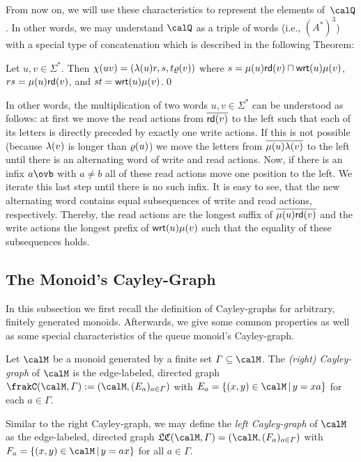 From now on, we will use these characteristics to represent the elements of~$\Qx$. In other words, we may understand $\Qx$ as a triple of words (i.e., $(A^*)^3$) with a special type of concatenation which is described in the following Theorem:

\begin{theorem}\label{thm:concat}
	Let $u,v\in\varSigma^*$. Then
	$\chi(uv)=(\lambda(u)r,s,t\varrho(v))$
	where $s=\mu(u)\mathsf{rd}(v)\sqcap\mathsf{wrt}(u)\mu(v)$, $rs=\mu(u)\mathsf{rd}(v)$, and $st=\mathsf{wrt}(u)\mu(v)$.\qed
\end{theorem}

In other words, the multiplication of two words $u,v\in\varSigma^*$ can be understood as follows: at first we move the read actions from $\overline{\mathsf{rd}(v)}$ to the left such that each of its letters is directly preceded by exactly one write actions. If this is not possible (because $\lambda(v)$ is longer than $\varrho(u)$) we move the letters from $\overline{\mu(u)\lambda(v)}$ to the left until there is an alternating word of write and read actions. Now, if there is an infix $a\ovb$ with $a\neq b$ all of these read actions move one position to the left. We iterate this last step until there is no such infix. It is easy to see, that the new alternating word contains equal subsequences of write and read actions, respectively. Thereby, the read actions are the longest suffix of $\overline{\mu(u)\mathsf{rd}(v)}$ and the write actions the longest prefix of $\mathsf{wrt}(u)\mu(v)$ such that the equality of these subsequences holds.

\subsection{The Monoid's Cayley-Graph}
In this subsection we first recall the definition of Cayley-graphs for arbitrary, finitely generated monoids. Afterwards, we give some common properties as well as some special characteristics of the queue monoid's Cayley-graph.

\begin{definition}
	Let $\calM$ be a monoid generated by a finite set $\varGamma\subseteq\calM$. The \emph{(right) Cayley-graph} of $\calM$ is the edge-labeled, directed graph $\cayley{\calM}{\varGamma}:=(\calM,(E_a)_{a\in\varGamma})$ with
	$E_a=\{(x,y)\in\calM\,|\,y=xa\}$
	for each $a\in\varGamma$.
\end{definition}

Similar to the right Cayley-graph, we may define the \emph{left Cayley-graph} of $\calM$ as the edge-labeled, directed graph $\lcayley{\calM}{\varGamma}=(\calM,(F_a)_{a\in\varGamma})$ with $F_a=\{(x,y)\in\calM\,|\,y=ax\}$ for all $a\in\varGamma$.

